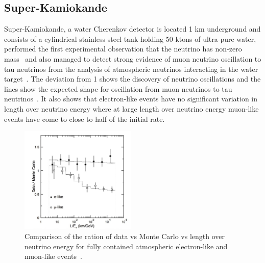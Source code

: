 \subsection{Super-Kamiokande}
Super-Kamiokande\cite{20SUPERK}, a water Cherenkov detector is located 1 km underground and consists of a cylindrical stainless steel tank holding 50 ktons of ultra-pure water, performed the first experimental observation that the neutrino has non-zero mass~\cite{10Fukuda} and also managed to detect strong evidence of muon neutrino oscillation to tau neutrinos from the analysis of atmospheric neutrinos interacting in the water target~. The deviation from 1 shows the discovery of neutrino oscillations and the lines show the expected shape for oscillation from muon neutrinos to tau neutrinos~\cite{10Fukuda}. It also shows that electron-like events have no significant variation in length over neutrino energy where at large length over neutrino energy muon-like events have come to close to half of the initial rate.

\begin{figure}[h!]
\centering
  \centering
\includegraphics[width=0.49\textwidth]{figures/simuSK2.jpeg}
\vspace{2mm}
\caption{Comparison of the ration of data vs Monte Carlo vs length over neutrino energy for fully contained atmospheric electron-like and muon-like events~\cite{10Fukuda}.}
\label{fig:SK2}
\end{figure}

